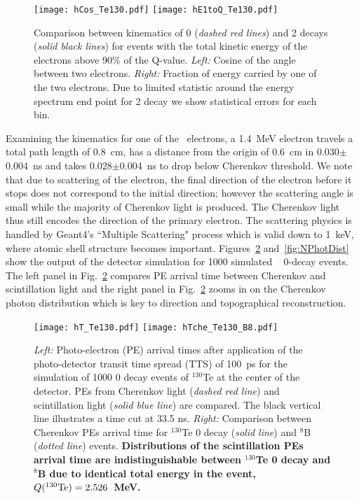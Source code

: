 \begin{figure}[ht]
  \centering
  \texttt{[image: hCos\_Te130.pdf]}
  \texttt{[image: hE1toQ\_Te130.pdf]}
  \caption{Comparison between kinematics of 0{\nbb} (\emph{dashed red
      lines}) and 2{\nbb} decays (\emph{solid black lines}) for events
    with the total kinetic energy of the electrons above 90\% of the
    Q-value. \emph{Left:} Cosine of the angle between two
    electrons. \emph{Right:} Fraction of energy carried by one of the
    two electrons. Due to limited statistic around the energy spectrum
    end point for 2{\nbb} decay we show statistical errors for each
    bin.}
  \label{fig:Kinematics}
\end{figure}


Examining the kinematics for one of the \bb~electrons, a 1.4~MeV electron travels a total path length of 0.8~cm, has a distance from the origin of 0.6~cm in 0.030$\pm$0.004~ns  and takes 0.028$\pm$0.004~ns to drop below Cherenkov threshold. We note that due to scattering of the electron, the final direction of the electron before it stops does not correspond to the initial direction; however the scattering angle is small while the majority of Cherenkov light is produced. The Cherenkov light thus still encodes the direction of the primary electron. The scattering physics is handled by Geant4's ``Multiple Scattering" process which is valid down to 1~keV, where atomic shell structure becomes important\cite{geant4scatt}. Figures~\ref{fig:ArrivalTimeDist} and~\ref{fig:NPhotDist} show the output of the detector simulation for 1000 simulated \Te~ 0\nbb-decay events. The left panel in Fig.~\ref{fig:ArrivalTimeDist} compares PE arrival time between Cherenkov and scintillation light  and the right panel in Fig.~\ref{fig:ArrivalTimeDist} zooms in on the Cherenkov photon distribution which is key to direction and topographical reconstruction.

\begin{figure}[ht]
  \centering
  \texttt{[image: hT\_Te130.pdf]}
  \texttt{[image: hTche\_Te130\_B8.pdf]}
  \caption{\emph{Left:} Photo-electron (PE) arrival times after
    application of the photo-detector transit time spread (TTS) of
    100~ps for the simulation of 1000 0{\nbb} decay events of
    $^{130}$Te at the center of the detector. PEs from Cherenkov light
    (\emph{dashed red line}) and scintillation light (\emph{solid blue
      line}) are compared. The black vertical line illustrates a time
    cut at 33.5 ns. \emph{Right:} Comparison between Cherenkov PEs
    arrival time for $^{130}$Te {0\nbb} decay (\emph{solid line}) and
    $^{8}$B (\emph{dotted line}) events. {\bf Distributions of the
      scintillation PEs arrival time are indistinguishable between
      $^{130}$Te 0{\nbb} decay and $^8$B due to identical total energy
      in the event, $Q(^{130}{\rm Te})=2.526$~MeV.} }
\label{fig:ArrivalTimeDist}
\end{figure}

